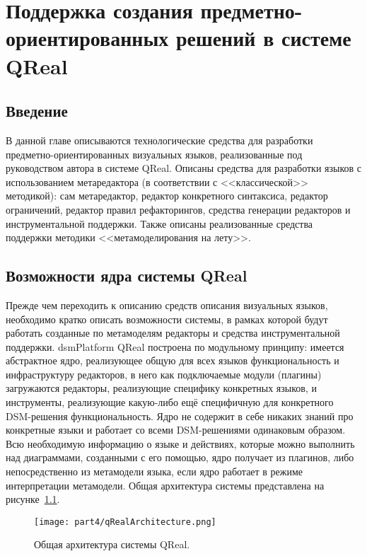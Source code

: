 \chapter{Поддержка создания предметно-ориентированных решений в системе QReal}
\label{chapter:implementation}

\section{Введение}
В данной главе описываются технологические средства для разработки предметно-ориентированных 
визуальных языков, реализованные под руководством автора в системе QReal. Описаны 
средства для разработки языков с использованием метаредактора (в соответствии с <<классической>> 
методикой): сам метаредактор, редактор конкретного синтаксиса, редактор ограничений, 
редактор правил рефакторингов, средства генерации редакторов и инструментальной поддержки. 
Также описаны реализованные средства поддержки методики <<метамоделирования на лету>>.

\section{Возможности ядра системы QReal}
Прежде чем переходить к описанию средств описания визуальных языков, необходимо кратко 
описать возможности системы, в рамках которой будут работать созданные по метамоделям 
редакторы и средства инструментальной поддержки. \ac{dsmPlatform} QReal построена по 
модульному принципу: имеется абстрактное ядро, реализующее общую для всех языков функциональность 
и инфраструктуру редакторов, в него как подключаемые модули (плагины) загружаются редакторы, 
реализующие специфику конкретных языков, и инструменты, реализующие какую-либо ещё 
специфичную для конкретного \ac{DSM}-решения функциональность. Ядро не содержит в себе 
никаких знаний про конкретные языки и работает со всеми \ac{DSM}-решениями одинаковым образом. 
Всю необходимую информацию о языке и действиях, которые можно выполнить над диаграммами, 
созданными с его помощью, ядро получает из плагинов, либо непосредственно из метамодели 
языка, если ядро работает в режиме интерпретации метамодели. Общая архитектура системы 
представлена на рисунке~\ref{qRealArchitecture}.

\begin{figure} [ht]
	\begin{center}
		\texttt{[image: part4/qRealArchitecture.png]}
		\caption{Общая архитектура системы QReal.}
		\label{qRealArchitecture}
	\end{center}
\end{figure}


